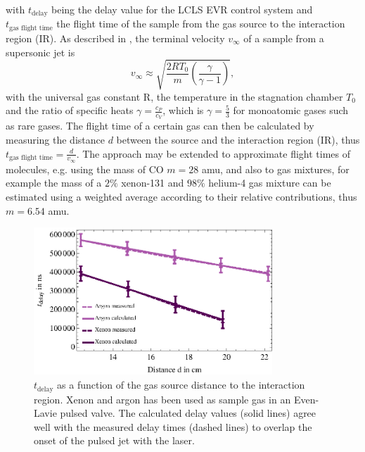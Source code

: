 with $t_{\text{delay}}$ being the delay value for the LCLS EVR control system and $t_{\text{gas flight time}}$ the flight time of the sample from the gas source to the interaction region (IR). As described in \citep{Miller-1988-Oxford}, the terminal velocity $v_{\infty}$ of a sample from a supersonic jet is
\begin{equation}
 v_{\infty} \approx \sqrt{\frac{2 R T_{0}}{m} \left(\frac{\gamma}{\gamma - 1}\right)},
\label{eqn:terminal-velocity}
\end{equation}
with the universal gas constant R, the temperature in the stagnation chamber $T_{0}$ and the ratio of specific heats $\gamma = \frac{c_{P}}{c_{V}}$, which is $\gamma = \frac{5}{3}$ for monoatomic gases such as rare gases. The flight time of a certain gas can then be calculated by measuring the distance $d$ between the source and the interaction region (IR), thus $t_{\text{gas flight time}}=\frac{d}{v_{\infty}}$. The approach may be extended to approximate flight times of molecules, e.g. using the mass of CO $m=28$ amu, and also to gas mixtures, for example the mass of a $2\%$ xenon-131 and $98\%$ helium-4 gas mixture can be estimated using a weighted average according to their relative contributions, thus  $m = 6.54$ amu.\\
\begin{figure}
	\centering
		\includegraphics[width=0.80\textwidth]{images/gas-jet-flight-times.eps}
	\caption[Event receiver time delay at LCLS for supersonic gas jets.]{$t_{\text{delay}}$ as a function of the gas source distance to the interaction region. Xenon and argon has been used as sample gas in an Even-Lavie pulsed valve. The calculated delay values (solid lines) agree well with the measured delay times (dashed lines) to overlap the onset of the pulsed jet with the laser.}
	\label{fig:LCLS-delay-data}
\end{figure}
